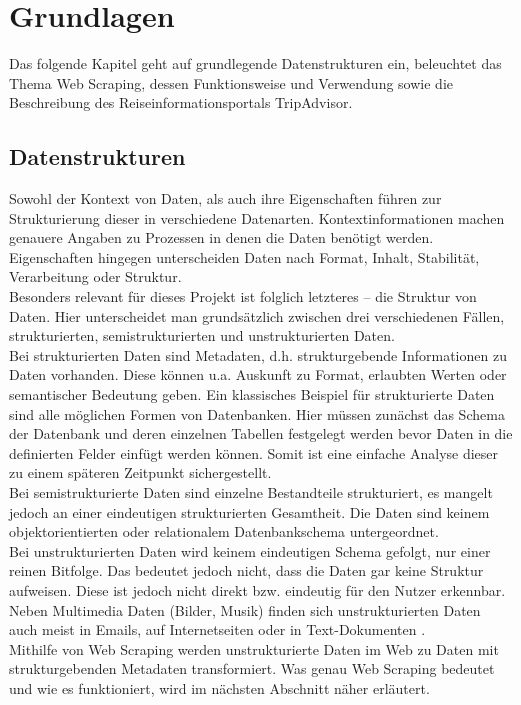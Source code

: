 \documentclass[a4paper,oneside,12pt]{report}
\begin{document}
		

	\chapter{Grundlagen}\label{grlagen}
	
		Das folgende Kapitel geht auf grundlegende Datenstrukturen ein, beleuchtet das Thema Web Scraping, dessen Funktionsweise und Verwendung sowie die Beschreibung des Reiseinformationsportals TripAdvisor. 
	
		\section{Datenstrukturen}
			
			Sowohl der Kontext von Daten, als auch ihre Eigenschaften führen zur Strukturierung dieser in verschiedene Datenarten. Kontextinformationen machen genauere Angaben zu Prozessen in denen die Daten benötigt werden. Eigenschaften hingegen unterscheiden Daten nach Format, Inhalt, Stabilität, Verarbeitung oder Struktur.
			\\
			Besonders relevant für dieses Projekt ist folglich letzteres – die Struktur von Daten. Hier unterscheidet man grundsätzlich zwischen drei verschiedenen Fällen, strukturierten, semistrukturierten und unstrukturierten Daten.
			\\
			Bei strukturierten Daten sind Metadaten, d.h. strukturgebende Informationen zu Daten vorhanden. Diese können u.a. Auskunft zu Format, erlaubten Werten oder semantischer Bedeutung geben. Ein klassisches Beispiel für strukturierte Daten sind alle möglichen Formen von Datenbanken. Hier müssen zunächst das Schema der Datenbank und deren einzelnen Tabellen festgelegt werden bevor Daten in die definierten Felder einfügt werden können. Somit ist eine einfache Analyse dieser zu einem späteren Zeitpunkt sichergestellt.
			\\
			Bei semistrukturierte Daten sind einzelne Bestandteile strukturiert, es mangelt jedoch an einer eindeutigen strukturierten Gesamtheit. Die Daten sind keinem objektorientierten oder relationalem Datenbankschema untergeordnet.
			\\
			Bei unstrukturierten Daten wird keinem eindeutigen Schema gefolgt, nur einer reinen Bitfolge. Das bedeutet jedoch nicht, dass die Daten gar keine Struktur aufweisen. Diese ist jedoch nicht direkt bzw. eindeutig für den Nutzer erkennbar. Neben Multimedia Daten (Bilder, Musik) finden sich unstrukturierten Daten auch meist in Emails, auf Internetseiten oder in Text-Dokumenten \cite{bib-daten}.
			\\
			Mithilfe von Web Scraping werden unstrukturierte Daten im Web zu Daten mit strukturgebenden Metadaten transformiert. Was genau Web Scraping bedeutet und wie es funktioniert, wird im nächsten Abschnitt näher erläutert.
			
\end{document}
